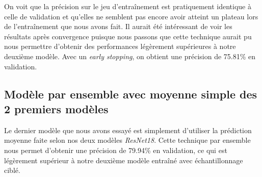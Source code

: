 On voit que la précision sur le jeu d'entraînement est pratiquement identique à celle de validation et qu'elles ne semblent pas encore avoir atteint un plateau lors de l'entraînement que nous avons fait. Il aurait été intéressant de voir les résultats après convergence puisque nous passons que cette technique aurait pu nous permettre d'obtenir des performances légèrement supérieures à notre deuxième modèle. 
Avec un \emph{early stopping}, on obtient une précision de 75.81\% en validation. 


\subsection{Modèle par ensemble avec moyenne simple des 2 premiers modèles}

Le dernier modèle que nous avons essayé est simplement d'utiliser la prédiction moyenne faite selon nos deux modèles \emph{ResNet18}. 
Cette technique par ensemble nous permet d'obtenir une précision de 79.94\% en validation, ce qui est légèrement supérieur à notre deuxième modèle entraîné avec échantillonnage ciblé. 

